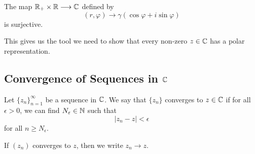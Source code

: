 \documentclass[a4paper]{report}
\begin{document}
\begin{prop}
    The map \( {\mathbb{R}}_{+} \times \mathbb{R} \longrightarrow \mathbb{C}^{} \) defined by 
    \[  (r, \varphi) \longrightarrow \gamma ( \cos \varphi + i \sin \varphi) \]
    is surjective.
\end{prop}

\begin{remark}
    This gives us the tool we need to show that every non-zero \( z \in \mathbb{C}  \) has a polar representation.
\end{remark}

\subsection{Convergence of Sequences in \( \C \)}

\begin{definition}[Convergence in \( \C  \)]
    Let \( {\{ {z}_{n} \} }_{n=1}^{\infty }     \) be a sequence in \( \C  \). We say that \( \{ {z}_{n} \}   \) converges to \( z \in \mathbb{C}  \) if for all \(  \epsilon > 0  \), we can find \( {N}_{\varepsilon} \in \mathbb{N}  \) such that  
    \[  | {z}_{n} - z  |  < \epsilon \]
    for all \( n \geq {N}_{\epsilon} \).
\end{definition}

If \( ({z}_{n}) \) converges to \( z  \), then we write \( {z}_{n} \to z  \).
\end{document}
